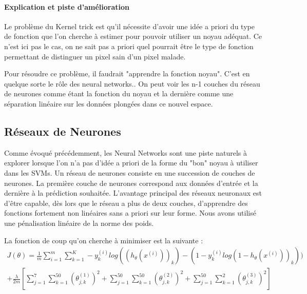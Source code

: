 \documentclass[a4paper,10pt]{report}
\begin{document}
\paragraph{Explication et piste d'amélioration}
Le problème du Kernel trick est qu'il nécessite d'avoir une idée a priori du type de fonction que l'on cherche à estimer pour pouvoir utiliser un noyau adéquat. Ce n'est ici pas le cas, on ne sait pas a priori quel pourrait être le type de fonction permettant de distinguer un pixel sain d'un pixel malade.

Pour résoudre ce problème, il faudrait "apprendre la fonction noyau". C'est en quelque sorte le rôle des neural networks.. On peut voir les n-1 couches du réseau de neurones comme étant la fonction du noyau et la dernière comme une séparation linéaire sur les données plongées dans ce nouvel espace.

\subsection{Réseaux de Neurones}

Comme évoqué précédemment, les Neural Networks sont une piste naturels à explorer lorsque l’on n’a pas d'idée a priori de la forme du "bon" noyau à utiliser dans les SVMs. Un réseau de neurones consiste en une succession de couches de neurones. La première couche de neurones correspond aux données d'entrée et la dernière à la prédiction souhaitée. L'avantage principal des réseaux neuronaux est d'être capable, dès lors que le réseau a plus de deux couches, d'apprendre des fonctions fortement non linéaires sans a priori sur leur forme. Nous avons utilisé une pénalisation linéaire de la norme des poids. 

La fonction de coup qu'on cherche à minimiser est la suivante :
\begin{equation}
\begin{split} 
J(\theta)= \frac{1}{m} \sum_{i=1}^m \sum_{k=1}^K -y_k^{(i)} log((h_{\theta}(x^{(i)}))_k) - (1 - y_k^{(i)}log(1 - h_{\theta}(x^{(i)}))_k))\\
 + \frac{\lambda}{2m}[\sum_{j=1}^7\sum_{k=1}^{50}(\theta_{j,k}^{(1)})^2 + \sum_{j=1}^{50}\sum_{k=1}^{50}(\theta_{j,k}^{(2)})^2 + \sum_{j=1}^{50}\sum_{k=1}^2(\theta_{j,k}^{(3)})^2]
\end{split}
\end{equation} 
\end{document}
